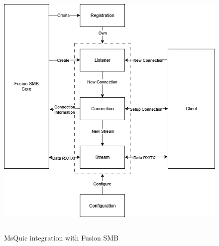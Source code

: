 \documentclass[english, 12pt, a4paper, elec, utf8, a-2b, online]{aaltothesis}
\begin{document}
\begin{figure}[h]
	\centering
	\includegraphics[alt={Block diagram of the flow between Fusion SMB and MsQuic}, height=12cm]{./images/MsQuic_integration.png}
	\caption{MsQuic integration with Fusion SMB}
	\label{fig:msquic_int}
\end{figure}
\end{document}
